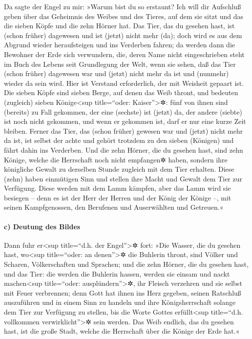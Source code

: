  Da sagte der Engel zu mir: »Warum bist du so erstaunt?
Ich will dir Aufschluß geben über das Geheimnis des Weibes und des
Tieres, auf dem sie sitzt und das die sieben Köpfe und die zehn Hörner
hat.  Das Tier, das du gesehen hast, ist (schon früher)
dagewesen und ist (jetzt) nicht mehr (da); doch wird es aus dem Abgrund
wieder heraufsteigen und ins Verderben fahren; da werden dann die
Bewohner der Erde sich verwundern, die, deren Name nicht eingeschrieben
steht im Buch des Lebens seit Grundlegung der Welt, wenn sie sehen, daß
das Tier (schon früher) dagewesen war und (jetzt) nicht mehr da ist und
(nunmehr) wieder da sein wird.  Hier ist Verstand
erforderlich, der mit Weisheit gepaart ist. Die sieben Köpfe sind sieben
Berge, auf denen das Weib thront,  und bedeuten
(zugleich) sieben Könige\textless sup title=``oder:
Kaiser''\textgreater✲: fünf von ihnen sind (bereits) zu Fall gekommen,
der eine (sechste) ist (jetzt) da, der andere (siebte) ist noch nicht
gekommen, und wenn er gekommen ist, darf er nur eine kurze Zeit bleiben.
 Ferner das Tier, das (schon früher) gewesen war und
(jetzt) nicht mehr da ist, ist selbst der achte und gehört trotzdem zu
den sieben (Königen) und fährt dahin ins Verderben.  Und
die zehn Hörner, die du gesehen hast, sind zehn Könige, welche die
Herrschaft noch nicht empfangen✲ haben, sondern ihre königliche Gewalt
zu derselben Stunde zugleich mit dem Tier erhalten. 
Diese (zehn) haben einmütigen Sinn und stellen ihre Macht und Gewalt dem
Tier zur Verfügung.  Diese werden mit dem Lamm kämpfen,
aber das Lamm wird sie besiegen -- denn es ist der Herr der Herren und
der König der Könige --, mit seinen Kampfgenossen, den Berufenen und
Auserwählten und Getreuen.«

\hypertarget{c-deutung-des-bildes}{%
\paragraph{c) Deutung des Bildes}\label{c-deutung-des-bildes}}

 Dann fuhr er\textless sup title=``d.h. der
Engel''\textgreater✲ fort: »Die Wasser, die du gesehen hast,
wo\textless sup title=``oder: an denen''\textgreater✲ die Buhlerin
thront, sind Völker und Scharen, Völkerschaften und Sprachen;
 und die zehn Hörner, die du gesehen hast, und das Tier:
die werden die Buhlerin hassen, werden sie einsam und nackt
machen\textless sup title=``oder: ausplündern''\textgreater✲, ihr
Fleisch verzehren und sie selbst mit Feuer verbrennen; 
denn Gott hat ihnen ins Herz gegeben, seinen Ratschluß auszuführen und
in einem Sinn zu handeln und ihre Königsherrschaft solange dem Tier zur
Verfügung zu stellen, bis die Worte Gottes erfüllt\textless sup
title=``d.h. vollkommen verwirklicht''\textgreater✲ sein werden.
 Das Weib endlich, das du gesehen hast, ist die große
Stadt, welche die Herrschaft über die Könige der Erde hat.«

